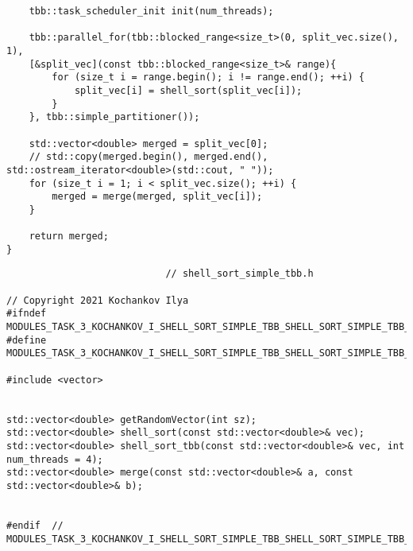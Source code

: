\documentclass{report}
\begin{document}
\begin{lstlisting}
    tbb::task_scheduler_init init(num_threads);

    tbb::parallel_for(tbb::blocked_range<size_t>(0, split_vec.size(), 1),
    [&split_vec](const tbb::blocked_range<size_t>& range){
        for (size_t i = range.begin(); i != range.end(); ++i) {
            split_vec[i] = shell_sort(split_vec[i]);
        }
    }, tbb::simple_partitioner());

    std::vector<double> merged = split_vec[0];
    // std::copy(merged.begin(), merged.end(), std::ostream_iterator<double>(std::cout, " "));
    for (size_t i = 1; i < split_vec.size(); ++i) {
        merged = merge(merged, split_vec[i]);
    }

    return merged;
}

\end{lstlisting}
\begin{lstlisting}
							// shell_sort_simple_tbb.h

// Copyright 2021 Kochankov Ilya
#ifndef MODULES_TASK_3_KOCHANKOV_I_SHELL_SORT_SIMPLE_TBB_SHELL_SORT_SIMPLE_TBB_H_
#define MODULES_TASK_3_KOCHANKOV_I_SHELL_SORT_SIMPLE_TBB_SHELL_SORT_SIMPLE_TBB_H_

#include <vector>


std::vector<double> getRandomVector(int sz);
std::vector<double> shell_sort(const std::vector<double>& vec);
std::vector<double> shell_sort_tbb(const std::vector<double>& vec, int num_threads = 4);
std::vector<double> merge(const std::vector<double>& a, const std::vector<double>& b);


#endif  // MODULES_TASK_3_KOCHANKOV_I_SHELL_SORT_SIMPLE_TBB_SHELL_SORT_SIMPLE_TBB_H_

\end{lstlisting}
\end{document}
